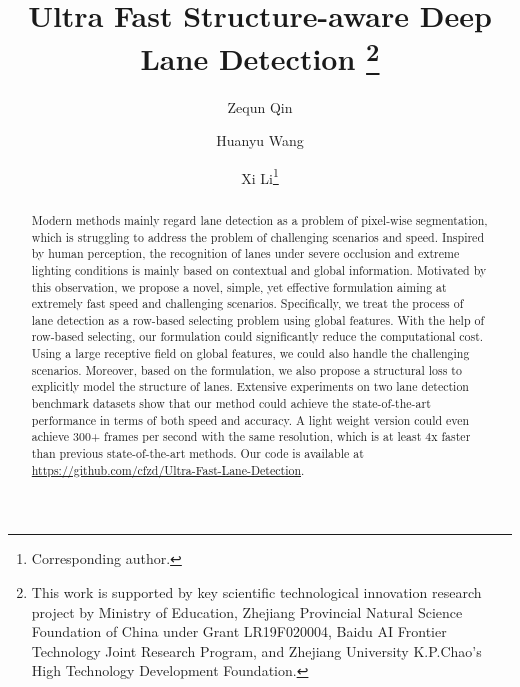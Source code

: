 \documentclass[runningheads]{llncs}
\begin{document}
\pagestyle{headings}
\mainmatter
\def\ECCVSubNumber{4584}  

\title{Ultra Fast Structure-aware Deep Lane Detection \thanks{\scriptsize This work is supported by key scientific technological innovation research project by Ministry of Education, Zhejiang Provincial Natural Science Foundation of China under
Grant LR19F020004, Baidu AI Frontier Technology Joint Research Program, and Zhejiang University K.P.Chao's High Technology Development Foundation. }} 

\begin{comment}
\titlerunning{ECCV-20 submission ID \ECCVSubNumber} 
\authorrunning{ECCV-20 submission ID \ECCVSubNumber} 
\author{Anonymous ECCV submission}
\institute{Paper ID \ECCVSubNumber}
\end{comment}


\author{Zequn Qin \and
Huanyu Wang \and
Xi Li\thanks{Corresponding author.}}


\maketitle
\begin{abstract}
Modern methods mainly regard lane detection as a problem of pixel-wise segmentation, 
which is struggling to address the problem of challenging scenarios and speed.
Inspired by human perception, the recognition of lanes under severe occlusion and extreme lighting conditions is mainly based on contextual and global information.
Motivated by this observation, we propose a novel, simple, yet effective formulation aiming at extremely fast speed and challenging scenarios. Specifically, we treat the process of lane detection as a row-based selecting problem using global features. With the help of row-based selecting, our formulation could significantly reduce the computational cost. Using a large receptive field on global features, we could also handle the challenging scenarios. Moreover, based on the formulation, we also propose a structural loss to explicitly model the structure of lanes.
Extensive experiments on two lane detection benchmark datasets show that our method could achieve the state-of-the-art performance in terms of both speed and accuracy. A light weight version could even achieve 300+ frames per second with the same resolution, which is at least 4x faster than previous state-of-the-art methods. Our code is available at \url{https://github.com/cfzd/Ultra-Fast-Lane-Detection}.

\end{abstract}
\end{document}
